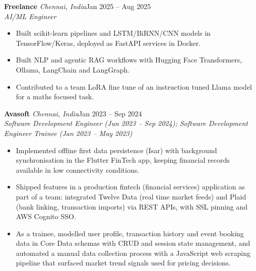 \documentclass[a4paper,11pt]{article}
\newcommand{\role}[4]{%
  \textbf{#1}{\color{muted}\,\textperiodcentered\,\textit{#2}}\hfill{\color{muted}#3}\\
  \textit{#4}\par}
\newcommand{\gap}{\vspace{5pt}}
\begin{document}
\gap
{}
\role{Freelance}{Chennai, India}{Jan 2025 – Aug 2025}{AI/ML Engineer}
\begin{itemize}
  \item Built scikit-learn pipelines and LSTM/BiRNN/CNN models in TensorFlow/Keras, deployed as FastAPI services in Docker.
  \item Built NLP and agentic RAG workflows with Hugging Face Transformers, Ollama, LangChain and LangGraph.
  \item Contributed to a team LoRA fine tune of an instruction tuned Llama model for a maths focused task.
\end{itemize}
\gap
{}
\role{Avasoft}{Chennai, India}{Jan 2023 – Sep 2024}{Software Development Engineer (Jun 2023 – Sep 2024); Software Development Engineer Trainee (Jan 2023 – May 2023)}
\begin{itemize}
  \item Implemented offline first data persistence (Isar) with background synchronisation in the Flutter FinTech app, keeping financial records available in low connectivity conditions.
  \item Shipped features in a production fintech (financial services) application as part of a team: integrated Twelve Data (real time market feeds) and Plaid (bank linking, transaction imports) via REST APIs, with SSL pinning and AWS Cognito SSO.
  \item As a trainee, modelled user profile, transaction history and event booking data in Core Data schemas with CRUD and session state management, and automated a manual data collection process with a JavaScript web scraping pipeline that surfaced market trend signals used for pricing decisions.
\end{itemize}
\end{document}
